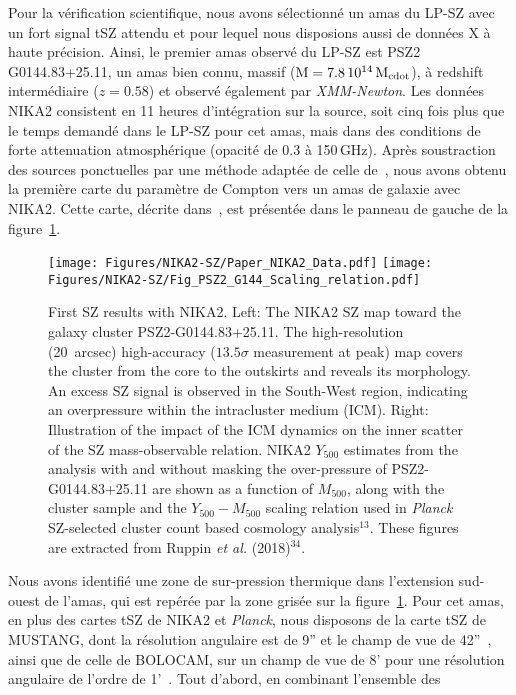 Pour la vérification scientifique, nous avons sélectionné un amas du
LP-SZ avec un fort signal tSZ attendu et pour lequel nous disposions
aussi de données X à haute précision. Ainsi, le premier amas observé
du LP-SZ est PSZ2\,G0144.83+25.11, un amas bien connu, massif
($\rm{M} = 7.8\,10^{14}\,\rm{M}_{cdot}$), à redshift intermédiaire
($z=0.58$) et observé également par \emph{XMM-Newton}. Les données
NIKA2 consistent en 11 heures d'intégration sur la source, soit cinq
fois plus que le temps demandé dans le LP-SZ pour cet amas, mais dans
des conditions de forte attenuation atmosphérique (opacité de 0.3 à
150\,GHz). Après soustraction des sources ponctuelles par une méthode
adaptée de celle de~\citet{Adam2016}, nous avons
obtenu la première carte du paramètre de Compton vers un amas de
galaxie avec NIKA2. Cette carte, décrite dans~\citet{Ruppin2018}, est
présentée dans le panneau de gauche de la figure~\ref{fig:nika2-sz}.
%
\begin{figure}
  \centering
  \texttt{[image: Figures/NIKA2-SZ/Paper\_NIKA2\_Data.pdf]}
  \texttt{[image: Figures/NIKA2-SZ/Fig\_PSZ2\_G144\_Scaling\_relation.pdf]}
  \caption{First SZ results with NIKA2. Left: The NIKA2 SZ map toward the galaxy cluster PSZ2-G0144.83+25.11. The high-resolution (20~arcsec) high-accuracy ($13.5\sigma $ measurement at peak) map covers the cluster from the core to the outskirts and reveals its morphology. An excess SZ signal is observed in the South-West region, indicating an overpressure within the intracluster medium (ICM). Right: Illustration of the impact of the ICM dynamics on the inner scatter of the SZ mass-observable relation. NIKA2 $Y_{500}$ estimates from the analysis with and without masking the over-pressure of PSZ2-G0144.83+25.11 are shown as a function of $M_{500}$, along with the cluster sample and the $Y_{500}-M_{500}$ scaling relation used in \emph{Planck} SZ-selected cluster count based cosmology analysis$^{13}$. These figures are extracted from Ruppin {\it et al.} (2018)$^{34}$. }
  \label{fig:nika2-sz}
\end{figure}
%
Nous avons identifié une zone de sur-pression thermique dans l'extension sud-ouest
de l'amas, qui est repérée par la zone grisée sur la
figure~\ref{fig:nika2-sz}. Pour cet amas, en plus des cartes tSZ de
NIKA2 et \emph{Planck}, nous disposons de la carte tSZ de MUSTANG, dont
la résolution angulaire est de 9'' et le champ de vue de
42''~\citep{Young2015}, ainsi que de celle de BOLOCAM, sur un champ de
vue de 8' pour une résolution angulaire de l'ordre de
1'~\citep{Sayers2013}. Tout d'abord, en combinant l'ensemble des
